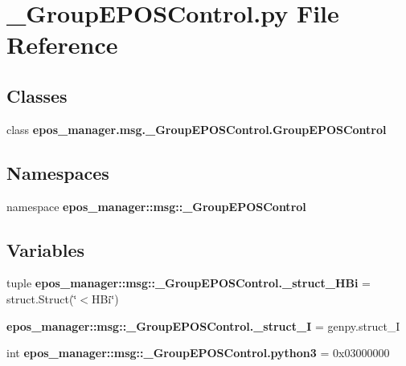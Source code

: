 \section{\-\_\-\-Group\-E\-P\-O\-S\-Control.\-py \-File \-Reference}
\label{__GroupEPOSControl_8py}
\subsection*{\-Classes}
\begin{DoxyCompactItemize}
\item 
class {\bf epos\-\_\-manager.\-msg.\-\_\-\-Group\-E\-P\-O\-S\-Control.\-Group\-E\-P\-O\-S\-Control}
\end{DoxyCompactItemize}
\subsection*{\-Namespaces}
\begin{DoxyCompactItemize}
\item 
namespace {\bf epos\-\_\-manager\-::msg\-::\-\_\-\-Group\-E\-P\-O\-S\-Control}
\end{DoxyCompactItemize}
\subsection*{\-Variables}
\begin{DoxyCompactItemize}
\item 
tuple {\bf epos\-\_\-manager\-::msg\-::\-\_\-\-Group\-E\-P\-O\-S\-Control.\-\_\-struct\-\_\-\-H\-Bi} = struct.\-Struct(\char`\"{}$<$\-H\-Bi\char`\"{})
\item 
{\bf epos\-\_\-manager\-::msg\-::\-\_\-\-Group\-E\-P\-O\-S\-Control.\-\_\-struct\-\_\-\-I} = genpy.\-struct\-\_\-\-I
\item 
int {\bf epos\-\_\-manager\-::msg\-::\-\_\-\-Group\-E\-P\-O\-S\-Control.\-python3} = 0x03000000
\end{DoxyCompactItemize}
